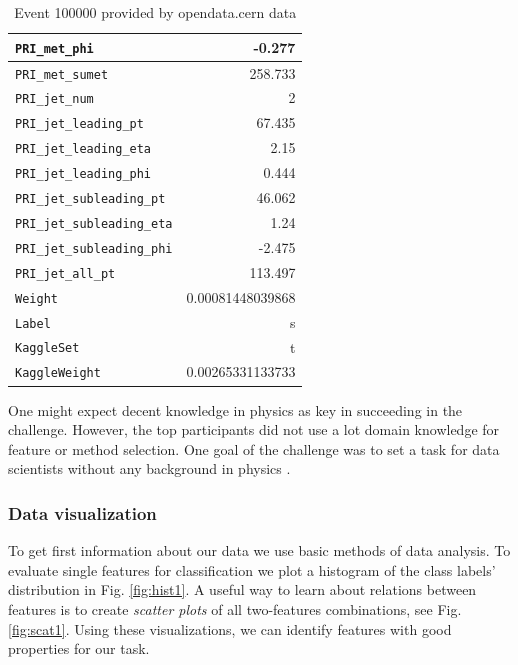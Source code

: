\begin{table}
\begin{center}
\begin{tabular}{|l|r|}
		\hline
		\texttt{PRI\_met\_phi} & -0.277 \\
		\hline
		\texttt{PRI\_met\_sumet} & 258.733 \\
		\hline
		\texttt{PRI\_jet\_num} & 2 \\
		\hline
		\texttt{PRI\_jet\_leading\_pt} & 67.435 \\
		\hline
		\texttt{PRI\_jet\_leading\_eta} & 2.15 \\
		\hline
		\texttt{PRI\_jet\_leading\_phi} & 0.444 \\
		\hline
		\texttt{PRI\_jet\_subleading\_pt} & 46.062 \\
		\hline
		\texttt{PRI\_jet\_subleading\_eta} & 1.24 \\
		\hline
		\texttt{PRI\_jet\_subleading\_phi} & -2.475 \\
		\hline
		\texttt{PRI\_jet\_all\_pt} & 113.497 \\
		\hline
		\texttt{Weight} & 0.00081448039868 \\
		\hline
		\texttt{Label} & s \\
		\hline
		\texttt{KaggleSet} & t \\
		\hline
		\texttt{KaggleWeight} & 0.00265331133733 \\
		\hline	
	\end{tabular}
\end{center}
\caption{Event 100000 provided by opendata.cern data\cite{higgsData}}
\label{tab:data}
\end{table}

One might expect decent knowledge in physics as key in succeeding in the challenge. However, the top participants did not use a lot domain knowledge for feature or method selection. One goal of the challenge was to set a task for data scientists without any background in physics \cite{higgsPaper}.

\subsubsection{Data visualization}
To get first information about our data we use basic methods of data analysis.
To evaluate single features for classification we plot a histogram of the class labels' distribution in Fig. \ref{fig:hist1}. A useful way to learn about relations between features is to create \emph{scatter plots} of all two-features combinations, see Fig. \ref{fig:scat1}.
Using these visualizations, we can identify features with good properties for our task.


